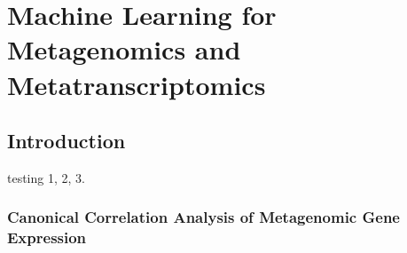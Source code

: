 \chapter{Machine Learning for Metagenomics and Metatranscriptomics}

\section{Introduction}
testing 1, 2, 3.

\subsection{Canonical Correlation Analysis of Metagenomic Gene Expression}


